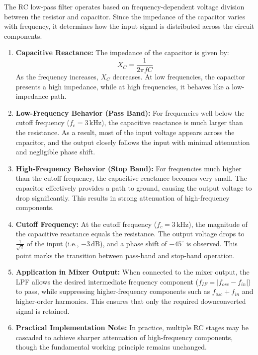 \documentclass[conference]{IEEEtran}
\begin{document}
The RC low-pass filter operates based on frequency-dependent voltage division between the resistor and capacitor. Since the impedance of the capacitor varies with frequency, it determines how the input signal is distributed across the circuit components.

\begin{enumerate}
    \item \textbf{Capacitive Reactance:}  
    The impedance of the capacitor is given by:
    \[
    X_C = \frac{1}{2\pi f C}
    \]
    As the frequency increases, $X_C$ decreases. At low frequencies, the capacitor presents a high impedance, while at high frequencies, it behaves like a low-impedance path.

    \item \textbf{Low-Frequency Behavior (Pass Band):}  
    For frequencies well below the cutoff frequency ($f_c = 3\,\text{kHz}$), the capacitive reactance is much larger than the resistance. As a result, most of the input voltage appears across the capacitor, and the output closely follows the input with minimal attenuation and negligible phase shift.

    \item \textbf{High-Frequency Behavior (Stop Band):}  
    For frequencies much higher than the cutoff frequency, the capacitive reactance becomes very small. The capacitor effectively provides a path to ground, causing the output voltage to drop significantly. This results in strong attenuation of high-frequency components.

    \item \textbf{Cutoff Frequency:}  
    At the cutoff frequency ($f_c = 3\,\text{kHz}$), the magnitude of the capacitive reactance equals the resistance. The output voltage drops to $\frac{1}{\sqrt{2}}$ of the input (i.e., $-3\,\text{dB}$), and a phase shift of $-45^\circ$ is observed. This point marks the transition between pass-band and stop-band operation.

    \item \textbf{Application in Mixer Output:}  
    When connected to the mixer output, the LPF allows the desired intermediate frequency component ($f_{IF} = |f_{osc} - f_{in}|$) to pass, while suppressing higher-frequency components such as $f_{osc} + f_{in}$ and higher-order harmonics. This ensures that only the required downconverted signal is retained.

    \item \textbf{Practical Implementation Note:}  
    In practice, multiple RC stages may be cascaded to achieve sharper attenuation of high-frequency components, though the fundamental working principle remains unchanged.
\end{enumerate}
\end{document}
